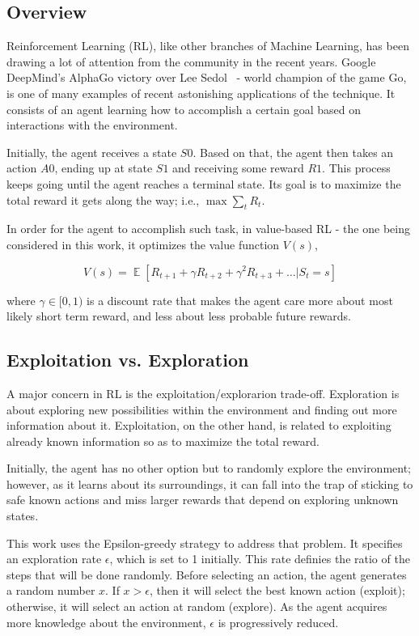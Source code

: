 \documentclass[11pt,twoside]{article}
\DeclareMathOperator*{\E}{\mathbb{E}}
\begin{document}
\subsection{Overview}

Reinforcement Learning (RL), like other branches of Machine Learning, has been drawing a lot of attention from the community in the recent years. Google DeepMind's AlphaGo victory over Lee Sedol~\cite{googlelee} - world champion of the game Go, is one of many examples of recent astonishing applications of the technique. It consists of an agent learning how to accomplish a certain goal based on interactions with the environment.

Initially, the agent receives a state $S0$. Based on that, the agent then takes an action $A0$, ending up at state $S1$ and receiving some reward $R1$. This process keeps going until the agent reaches a terminal state. Its goal is to maximize the total reward it gets along the way; i.e., $\max \sum_{t} R_t$.

In order for the agent to accomplish such task, in value-based RL - the one being considered in this work, it optimizes the value function $V(s)$,

\begin{equation} \label{eq:1}
	V(s) = \E [R_{t+1} + \gamma R_{t+2} + \gamma^{2} R_{t+3} + \ldots | S_t = s] 
\end{equation}
 
where $\gamma \in [0,1)$ is a discount rate that makes the agent care more about most likely short term reward, and less about less probable future rewards.

\subsection{Exploitation vs. Exploration}
 
A major concern in RL is the exploitation/explorarion trade-off. Exploration is about exploring new possibilities within the environment and finding out more information about it. Exploitation, on the other hand, is related to exploiting already known information so as to maximize the total reward. 

Initially, the agent has no other option but to randomly explore the environment; however, as it learns about its surroundings, it can fall into the trap of sticking to safe known actions and miss larger rewards that depend on exploring unknown states.

This work uses the Epsilon-greedy strategy to address that problem. It specifies an exploration rate $\epsilon$, which is set to 1 initially. This rate definies the ratio of the steps that will be done randomly. Before selecting an action, the agent generates a random number $x$. If $x > \epsilon$, then it will select the best known action (exploit); otherwise, it will select an action at random (explore). As the agent acquires more knowledge about the environment, $\epsilon$ is progressively reduced.
\end{document}
